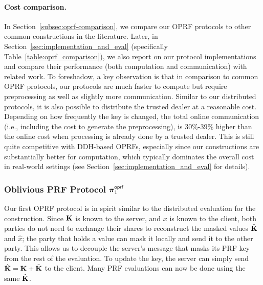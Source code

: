 \paragraph{Cost comparison.}
In Section~\ref{subsec:oprf-comparison}, we compare our OPRF protocols to other common constructions in the literature. Later, in Section~\ref{sec:implementation_and_eval} (specifically Table~\ref{table:oprf_comparison}), we also report on our protocol implementations and compare their performance (both computation and communication) with related work. To foreshadow, a key observation is that in comparison to common OPRF protocols, our protocols are much faster to compute but require preprocessing as well as slightly more communication. Similar to our distributed protocols, it is also possible to distribute the trusted dealer at a reasonable cost. Depending on how frequently the key is changed, the total online communication (i.e., including the cost to generate the preprocessing), is 30\%-39\% higher than the online cost when processing is already done by a trusted dealer. This is still quite competitive with DDH-based OPRFs, especially since our constructions are substantially better for computation, which typically dominates the overall cost in real-world settings (see Section~\ref{sec:implementation_and_eval} for details).


\subsubsection{Oblivious PRF Protocol $\boldsymbol{\pi}^{\textsf{oprf}}_1$}
\label{subsec:oprf1}
Our first OPRF protocol is in spirit similar to the distributed evaluation for the \ttwPRF construction. Since $\mat{K}$ is known to the server, and $x$ is known to the client, both parties do not need to exchange their shares to reconstruct the masked values $\hat{\mat{K}}$ and $\hat{x}$; the party that holds a value can mask it locally and send it to the other party. This allows us to decouple the server's message that masks its PRF key from the rest of the evaluation. To update the key, the server can simply send $\hat{\mat{K}} = \mat{K} + \tilde{\mat{K}}$ to the client. Many PRF evaluations can now be done using the same $\hat{\mat{K}}$.

